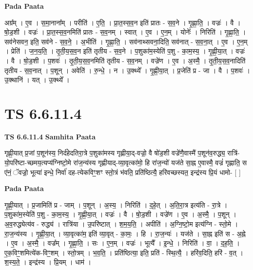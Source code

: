 \documentclass[17pt]{extarticle}
\begin{document}
\textbf{Pada Paata} \newline

अग्र᳚म् । ए॒व । स॒मा॒नाना᳚म् । परीति॑ । ए॒ति॒ । प्रा॒त॒स्स॒व॒न इति॑ प्रातः - स॒व॒ने । गृ॒ह्णा॒ति॒ । वज्रः॑ । वै । षो॒ड॒शी । वज्रः॑ । प्रा॒त॒स्स॒व॒नमिति॑ प्रातः - स॒व॒नम् । स्वात् । ए॒व । ए॒न॒म् । योनेः᳚ । निरिति॑ । गृ॒ह्णा॒ति॒ । सव॑नेसवन॒ इति॒ सव॑ने - स॒व॒ने॒ । अ॒भीति॑ । गृ॒ह्णा॒ति॒ । सव॑नाथ्सवना॒दिति॒ सव॑नात् - स॒व॒ना॒त् । ए॒व । ए॒न॒म् । प्रेति॑ । ज॒न॒य॒ति॒ । तृ॒ती॒य॒स॒व॒न इति॑ तृतीय - स॒व॒ने । प॒शुका॑म॒स्येति॑ प॒शु - का॒म॒स्य॒ । गृ॒ह्णी॒या॒त् । वज्रः॑ । वै । षो॒ड॒शी । प॒शवः॑ । तृ॒ती॒य॒स॒व॒नमिति॑ तृतीय - स॒व॒नम् । वज्रे॑ण । ए॒व । अ॒स्मै॒ । तृ॒ती॒य॒स॒व॒नादिति॑ तृतीय - स॒व॒नात् । प॒शून् । अवेति॑ । रु॒न्धे॒ । न । उ॒क्थ्ये᳚ । गृ॒ह्णी॒या॒त् । प्र॒जेति॑ प्र - जा । वै । प॒शवः॑ । उ॒क्थानि॑ । यत् । उ॒क्थ्ये᳚ ।  \newline




\section*{ TS 6.6.11.4 }

\textbf{TS 6.6.11.4 } \newline
\textbf{Samhita Paata} \newline

गृह्णी॒यात् प्र॒जां प॒शून॑स्य॒ निर्द॑हेदतिरा॒त्रे प॒शुका॑मस्य गृह्णीया॒द्-वज्रो॒ वै षो॑ड॒शी वज्रे॑णै॒वास्मै॑ प॒शून॑व॒रुद्ध्य॒ रात्रि॑-यो॒परि॑ष्टा-च्छमय॒त्यप्य॑ग्निष्टो॒मे रा॑ज॒न्य॑स्य गृह्णीयाद्-व्या॒वृत्का॑मो॒ हि रा॑ज॒न्यो॑ यज॑ते सा॒ह्न ए॒वास्मै॒ वज्रं॑ गृह्णाति॒ स ए॑नं॒ ॅवज्रो॒ भूत्या॑ इन्धे॒ निर्वा॑ दह-त्येकविꣳ॒॒शꣳ स्तो॒त्रं भ॑वति॒ प्रति॑ष्ठित्यै॒ हरि॑वच्छस्यत॒ इन्द्र॑स्य प्रि॒यं धामो- [  ] \newline

\textbf{Pada Paata} \newline

गृ॒ह्णी॒यात् । प्र॒जामिति॑ प्र - जाम् । प॒शून् । अ॒स्य॒ । निरिति॑ । द॒हे॒त् । अ॒ति॒रा॒त्र इत्य॑ति - रा॒त्रे । प॒शुका॑म॒स्येति॑ प॒शु - का॒म॒स्य॒ । गृ॒ह्णी॒या॒त् । वज्रः॑ । वै । षो॒ड॒शी । वज्रे॑ण । ए॒व । अ॒स्मै॒ । प॒शून् । अ॒व॒रुद्ध्येत्य॑व - रुद्ध्य॑ । रात्रि॑या । उ॒परि॑ष्टात् । श॒म॒य॒ति॒ । अपीति॑ । अ॒ग्नि॒ष्टो॒म इत्य॑ग्नि - स्तो॒मे । रा॒ज॒न्य॑स्य । गृ॒ह्णी॒या॒त् । व्या॒वृत्का॑म॒ इति॑ व्या॒वृत् - का॒मः॒ । हि । रा॒ज॒न्यः॑ । यज॑ते । सा॒ह्न इति॑ स - अ॒ह्ने । ए॒व । अ॒स्मै॒ । वज्र᳚म् । गृ॒ह्णा॒ति॒ । सः । ए॒न॒म् । वज्रः॑ । भूत्यै᳚ । इ॒न्धे॒ । निरिति॑ । वा॒ । द॒ह॒ति॒ । ए॒क॒विꣳ॒॒शमित्ये॑क-विꣳ॒॒शम् । स्तो॒त्रम् । भ॒व॒ति॒ । प्रति॑ष्ठित्या॒ इति॒ प्रति॑ - स्थि॒त्यै॒ । हरि॑व॒दिति॒ हरि॑ - व॒त् । श॒स्य॒ते॒ । इन्द्र॑स्य । प्रि॒यम् । धाम॑ ।  \newline
\end{document}
